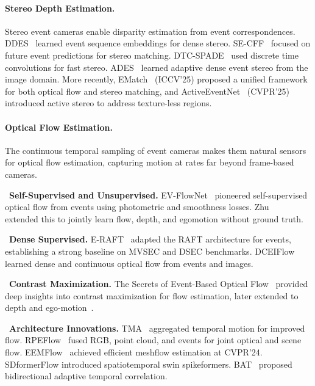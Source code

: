 \paragraph{Stereo Depth Estimation.}
Stereo event cameras enable disparity estimation from event correspondences. DDES~\cite{tulyakov2019ddes} learned event sequence embeddings for dense stereo. SE-CFF~\cite{nam2022secff} focused on future event predictions for stereo matching. DTC-SPADE~\cite{zhang2022dtcspade} used discrete time convolutions for fast stereo. ADES~\cite{cho2023ades} learned adaptive dense event stereo from the image domain. More recently, EMatch~\cite{li2025ematch} (ICCV'25) proposed a unified framework for both optical flow and stereo matching, and ActiveEventNet~\cite{wang2025activeeventnet} (CVPR'25) introduced active stereo to address texture-less regions.

\paragraph{Optical Flow Estimation.}
The continuous temporal sampling of event cameras makes them natural sensors for optical flow estimation, capturing motion at rates far beyond frame-based cameras.

\noindent{}~\textbf{Self-Supervised and Unsupervised.} EV-FlowNet~\cite{zhu2018evflownet} pioneered self-supervised optical flow from events using photometric and smoothness losses. Zhu~\etal~\cite{zhu2019unsupervised} extended this to jointly learn flow, depth, and egomotion without ground truth.

\noindent{}~\textbf{Dense Supervised.} E-RAFT~\cite{gehrig2021eraft} adapted the RAFT architecture for events, establishing a strong baseline on MVSEC and DSEC benchmarks. DCEIFlow~\cite{wan2022dceiflow} learned dense and continuous optical flow from events and images.

\noindent{}~\textbf{Contrast Maximization.} The Secrets of Event-Based Optical Flow~\cite{shiba2022secretsof} provided deep insights into contrast maximization for flow estimation, later extended to depth and ego-motion~\cite{shiba2024cmaxsecrets}.

\noindent{}~\textbf{Architecture Innovations.} TMA~\cite{liu2023tma} aggregated temporal motion for improved flow. RPEFlow~\cite{wan2023rpeflow} fused RGB, point cloud, and events for joint optical and scene flow. EEMFlow~\cite{liu2024eemflow} achieved efficient meshflow estimation at CVPR'24. SDformerFlow introduced spatiotemporal swin spikeformers. BAT~\cite{li2025bat} proposed bidirectional adaptive temporal correlation.

